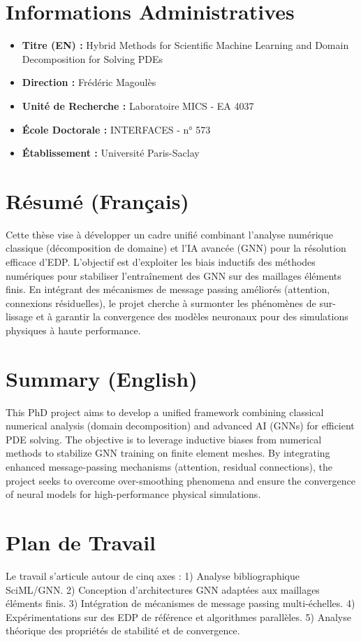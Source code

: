 \documentclass[a4paper,11pt]{article}
\begin{document}
\section*{Informations Administratives}
\begin{itemize}[label=--]
    \item \textbf{Titre (EN) :} Hybrid Methods for Scientific Machine Learning and Domain Decomposition for Solving PDEs
    \item \textbf{Direction :} Frédéric Magoulès
    \item \textbf{Unité de Recherche :} Laboratoire MICS - EA 4037
    \item \textbf{École Doctorale :} INTERFACES - n° 573
    \item \textbf{Établissement :} Université Paris-Saclay
\end{itemize}

\section*{Résumé (Français)}
Cette thèse vise à développer un cadre unifié combinant l'analyse numérique classique (décomposition de domaine) et l'IA avancée (GNN) pour la résolution efficace d'EDP. L'objectif est d'exploiter les biais inductifs des méthodes numériques pour stabiliser l'entraînement des GNN sur des maillages éléments finis. En intégrant des mécanismes de message passing améliorés (attention, connexions résiduelles), le projet cherche à surmonter les phénomènes de sur-lissage et à garantir la convergence des modèles neuronaux pour des simulations physiques à haute performance.

\section*{Summary (English)}
This PhD project aims to develop a unified framework combining classical numerical analysis (domain decomposition) and advanced AI (GNNs) for efficient PDE solving. The objective is to leverage inductive biases from numerical methods to stabilize GNN training on finite element meshes. By integrating enhanced message-passing mechanisms (attention, residual connections), the project seeks to overcome over-smoothing phenomena and ensure the convergence of neural models for high-performance physical simulations.

\section{Plan de Travail}
Le travail s'articule autour de cinq axes : 1) Analyse bibliographique SciML/GNN. 2) Conception d'architectures GNN adaptées aux maillages éléments finis. 3) Intégration de mécanismes de message passing multi-échelles. 4) Expérimentations sur des EDP de référence et algorithmes parallèles. 5) Analyse théorique des propriétés de stabilité et de convergence.
\end{document}
